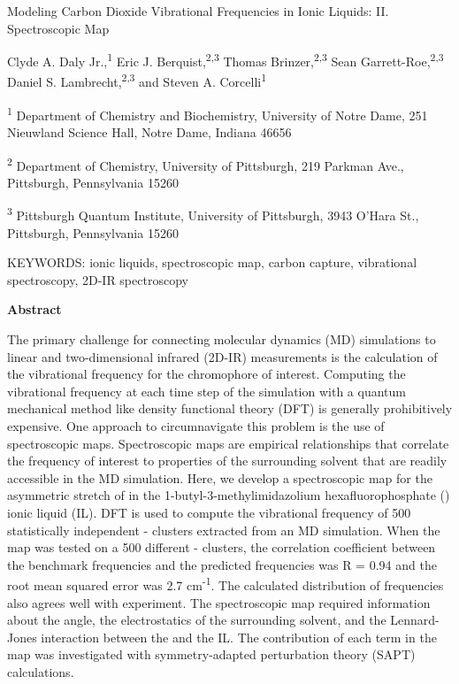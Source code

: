 \documentclass[]{article}
\date{}
\begin{document}
Modeling Carbon Dioxide Vibrational Frequencies in Ionic Liquids: II.  Spectroscopic Map

Clyde A. Daly Jr.,\textsuperscript{1} Eric J.  Berquist,\textsuperscript{2,3} Thomas Brinzer,\textsuperscript{2,3} Sean Garrett-Roe,\textsuperscript{2,3} Daniel S.  Lambrecht,\textsuperscript{2,3} and Steven A.  Corcelli\textsuperscript{1}

\textsuperscript{1} Department of Chemistry and Biochemistry, University of Notre Dame, 251 Nieuwland Science Hall, Notre Dame, Indiana 46656

\textsuperscript{2} Department of Chemistry, University of Pittsburgh, 219 Parkman Ave., Pittsburgh, Pennsylvania 15260

\textsuperscript{3} Pittsburgh Quantum Institute, University of Pittsburgh, 3943 O'Hara St., Pittsburgh, Pennsylvania 15260

KEYWORDS: ionic liquids, spectroscopic map, carbon capture, vibrational spectroscopy, 2D-IR spectroscopy

\textbf{Abstract}

The primary challenge for connecting molecular dynamics (MD) simulations to linear and two-dimensional infrared (2D-IR) measurements is the calculation of the vibrational frequency for the chromophore of interest. Computing the vibrational frequency at each time step of the simulation with a quantum mechanical method like density functional theory (DFT) is generally prohibitively expensive. One approach to circumnavigate this problem is the use of spectroscopic maps.  Spectroscopic maps are empirical relationships that correlate the frequency of interest to properties of the surrounding solvent that are readily accessible in the MD simulation. Here, we develop a spectroscopic map for the asymmetric stretch of  in the 1-butyl-3-methylimidazolium hexafluorophosphate (\ce{[C4C1im][PF6]}) ionic liquid (IL). DFT is used to compute the vibrational frequency of 500 statistically independent -\ce{[C4C1im][PF6]} clusters extracted from an MD simulation. When the map was tested on a 500 different -\ce{[C4C1im][PF6]} clusters, the correlation coefficient between the benchmark frequencies and the predicted frequencies was R = 0.94 and the root mean squared error was 2.7 cm\textsuperscript{-1}. The calculated distribution of frequencies also agrees well with experiment. The spectroscopic map required information about the  angle, the electrostatics of the surrounding solvent, and the Lennard-Jones interaction between the  and the IL. The contribution of each term in the map was investigated with symmetry-adapted perturbation theory (SAPT) calculations.
\end{document}
